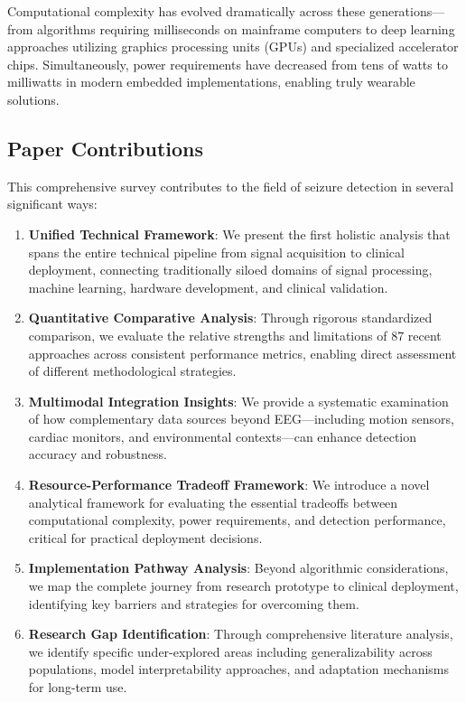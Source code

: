 \documentclass[pdflatex,sn-mathphys-num]{sn-jnl}%
\theoremstyle{thmstyleone}%
\theoremstyle{thmstyletwo}%
\theoremstyle{thmstylethree}%
\begin{document}
Computational complexity has evolved dramatically across these generations—from algorithms requiring milliseconds on mainframe computers to deep learning approaches utilizing graphics processing units (GPUs) and specialized accelerator chips. Simultaneously, power requirements have decreased from tens of watts to milliwatts in modern embedded implementations, enabling truly wearable solutions.

\subsection{Paper Contributions}

This comprehensive survey contributes to the field of seizure detection in several significant ways:

\begin{enumerate}
    \item \textbf{Unified Technical Framework}: We present the first holistic analysis that spans the entire technical pipeline from signal acquisition to clinical deployment, connecting traditionally siloed domains of signal processing, machine learning, hardware development, and clinical validation.
    \item \textbf{Quantitative Comparative Analysis}: Through rigorous standardized comparison, we evaluate the relative strengths and limitations of 87 recent approaches across consistent performance metrics, enabling direct assessment of different methodological strategies.
    \item \textbf{Multimodal Integration Insights}: We provide a systematic examination of how complementary data sources beyond EEG—including motion sensors, cardiac monitors, and environmental contexts—can enhance detection accuracy and robustness.
    \item \textbf{Resource-Performance Tradeoff Framework}: We introduce a novel analytical framework for evaluating the essential tradeoffs between computational complexity, power requirements, and detection performance, critical for practical deployment decisions.
    \item \textbf{Implementation Pathway Analysis}: Beyond algorithmic considerations, we map the complete journey from research prototype to clinical deployment, identifying key barriers and strategies for overcoming them.
    \item \textbf{Research Gap Identification}: Through comprehensive literature analysis, we identify specific under-explored areas including generalizability across populations, model interpretability approaches, and adaptation mechanisms for long-term use.
\end{enumerate}
\end{document}
